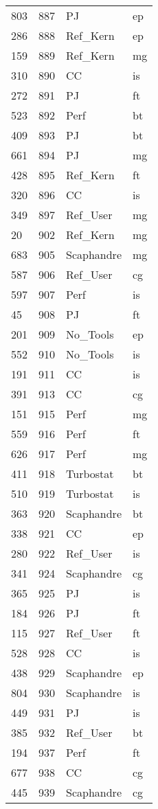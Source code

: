 \begin{tabular}{lrll}
803 & 887 & PJ & ep \\
286 & 888 & Ref_Kern & ep \\
159 & 889 & Ref_Kern & mg \\
310 & 890 & CC & is \\
272 & 891 & PJ & ft \\
523 & 892 & Perf & bt \\
409 & 893 & PJ & bt \\
661 & 894 & PJ & mg \\
428 & 895 & Ref_Kern & ft \\
320 & 896 & CC & is \\
349 & 897 & Ref_User & mg \\
20 & 902 & Ref_Kern & mg \\
683 & 905 & Scaphandre & mg \\
587 & 906 & Ref_User & cg \\
597 & 907 & Perf & is \\
45 & 908 & PJ & ft \\
201 & 909 & No_Tools & ep \\
552 & 910 & No_Tools & is \\
191 & 911 & CC & is \\
391 & 913 & CC & cg \\
151 & 915 & Perf & mg \\
559 & 916 & Perf & ft \\
626 & 917 & Perf & mg \\
411 & 918 & Turbostat & bt \\
510 & 919 & Turbostat & is \\
363 & 920 & Scaphandre & bt \\
338 & 921 & CC & ep \\
280 & 922 & Ref_User & is \\
341 & 924 & Scaphandre & cg \\
365 & 925 & PJ & is \\
184 & 926 & PJ & ft \\
115 & 927 & Ref_User & ft \\
528 & 928 & CC & is \\
438 & 929 & Scaphandre & ep \\
804 & 930 & Scaphandre & is \\
449 & 931 & PJ & is \\
385 & 932 & Ref_User & bt \\
194 & 937 & Perf & ft \\
677 & 938 & CC & cg \\
445 & 939 & Scaphandre & cg \\

\end{tabular}
